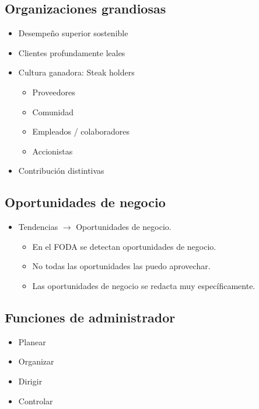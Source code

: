 \subsection{Organizaciones grandiosas}
\begin{itemize}
    \item Desempeño superior sostenible 
    \item Clientes profundamente leales 
    \item Cultura ganadora: Steak holders
        \begin{itemize}
            \item Proveedores 
            \item Comunidad 
            \item Empleados / colaboradores 
            \item Accionistas 
        \end{itemize}

    \item Contribución distintivas
\end{itemize}



\subsection{Oportunidades de negocio}
\begin{itemize}
    \item Tendencias $\rightarrow $ Oportunidades de negocio. 
        \begin{itemize}
            \item En el FODA se detectan oportunidades de negocio.
            \item No todas las oportunidades las puedo aprovechar.
            \item Las oportunidades de negocio se redacta muy específicamente.
        \end{itemize}
\end{itemize}



\subsection{Funciones de administrador}
\begin{itemize}
    \item Planear
    \item Organizar
    \item Dirigir
    \item Controlar 
\end{itemize}


